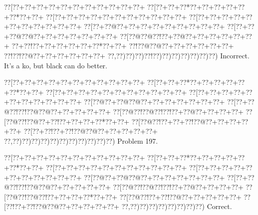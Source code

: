 \documentclass[a5paper]{article}
\begin{document}
\begin{center}
{\goo
\0??[\0??+\0??+\0??+\0??+\0??+\0??+\0??+\0??+\0??+\0??+\0??+
\0??[\0??+\0??+\0??*\0??+\0??+\0??+\0??+\0??+\0??*\0??+\0??+
\0??[\0??+\0??+\0??+\0??+\0??+\0??+\0??+\0??+\0??+\0??+\0??+
\0??[\0??+\0??+\0??+\0??+\0??+\0??+\0??+\0??+\0??+\0??+\0??+
\0??[\0??+\0??@\0??+\0??+\0??+\0??+\0??+\0??+\0??+\0??+\0??+
\0??[\0??+\0??+\0??@\0??@\0??+\0??+\0??+\0??+\0??+\0??+\0??+
\0??[\0??@\0??@\0??!\0??+\0??@\0??+\0??+\0??+\0??+\0??+\0??+
\0??+\0??!\0??+\0??+\0??+\0??+\0??+\0??*\0??+\0??+
\0??!\0??@\0??@\0??+\0??+\0??+\0??+\0??+\0??+
\0??!\0??!\0??@\0??+\0??+\0??+\0??+\0??+\0??+
\0??,\0??)\0??)\0??)\0??!\0??)\0??)\0??)\0??)\0??)\0??)\0??)
}
Incorrect. It's a ko, but black can do better.

\end{center}
\newpage
\begin{center}
{\goo
\0??[\0??+\0??+\0??+\0??+\0??+\0??+\0??+\0??+\0??+\0??+\0??+
\0??[\0??+\0??+\0??*\0??+\0??+\0??+\0??+\0??+\0??*\0??+\0??+
\0??[\0??+\0??+\0??+\0??+\0??+\0??+\0??+\0??+\0??+\0??+\0??+
\0??[\0??+\0??+\0??+\0??+\0??+\0??+\0??+\0??+\0??+\0??+\0??+
\0??[\0??@\0??+\0??@\0??@\0??+\0??+\0??+\0??+\0??+\0??+\0??+
\0??[\0??+\0??@\0??!\0??!\0??@\0??@\0??+\0??+\0??+\0??+\0??+
\0??[\0??@\0??!\0??@\0??!\0??!\0??+\0??@\0??+\0??+\0??+\0??+
\0??[\0??@\0??!\0??@\0??+\0??!\0??+\0??+\0??+\0??*\0??+\0??+
\0??[\0??@\0??!\0??+\0??+\0??!\0??@\0??+\0??+\0??+\0??+\0??+
\0??[\0??+\0??!\0??+\0??!\0??@\0??@\0??+\0??+\0??+\0??+\0??+
\0??,\0??)\0??)\0??)\0??)\0??)\0??)\0??)\0??)\0??)\0??)\0??)
}
Problem 197.

\end{center}
\begin{center}
{\goo
\0??[\0??+\0??+\0??+\0??+\0??+\0??+\0??+\0??+\0??+\0??+\0??+
\0??[\0??+\0??+\0??*\0??+\0??+\0??+\0??+\0??+\0??*\0??+\0??+
\0??[\0??+\0??+\0??+\0??+\0??+\0??+\0??+\0??+\0??+\0??+\0??+
\0??[\0??+\0??+\0??+\0??+\0??+\0??+\0??+\0??+\0??+\0??+\0??+
\0??[\0??@\0??+\0??@\0??@\0??+\0??+\0??+\0??+\0??+\0??+\0??+
\0??[\0??+\0??@\0??!\0??!\0??@\0??@\0??+\0??+\0??+\0??+\0??+
\0??[\0??@\0??!\0??@\0??!\0??!\0??+\0??@\0??+\0??+\0??+\0??+
\0??[\0??@\0??!\0??@\0??!\0??+\0??+\0??+\0??*\0??+\0??+
\0??[\0??@\0??!\0??+\0??!\0??@\0??+\0??+\0??+\0??+\0??+
\0??[\0??!\0??+\0??!\0??@\0??@\0??+\0??+\0??+\0??+\0??+
\0??,\0??)\0??)\0??)\0??)\0??)\0??)\0??)\0??)
}
Correct. 

\end{center}
\end{document}
